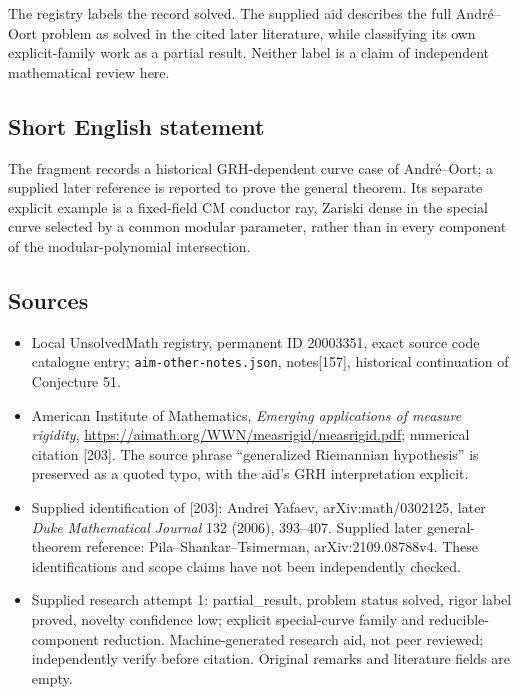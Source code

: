 \documentclass[11pt]{article}
\begin{document}
The registry labels the record solved. The supplied aid describes the full Andr\'e--Oort problem as solved in the cited later literature, while classifying its own explicit-family work as a partial result. Neither label is a claim of independent mathematical review here.
\subsection{Short English statement}
The fragment records a historical GRH-dependent curve case of Andr\'e--Oort; a supplied later reference is reported to prove the general theorem. Its separate explicit example is a fixed-field CM conductor ray, Zariski dense in the special curve selected by a common modular parameter, rather than in every component of the modular-polynomial intersection.
\subsection{Sources}
\begin{itemize}
\item Local UnsolvedMath registry, permanent ID 20003351, exact source code catalogue entry; \texttt{aim-other-notes.json}, notes[157], historical continuation of Conjecture 51.
\item American Institute of Mathematics, \emph{Emerging applications of measure rigidity}, \url{https://aimath.org/WWN/measrigid/measrigid.pdf}; numerical citation [203]. The source phrase ``generalized Riemannian hypothesis'' is preserved as a quoted typo, with the aid's GRH interpretation explicit.
\item Supplied identification of [203]: Andrei Yafaev, arXiv:math/0302125, later \emph{Duke Mathematical Journal} 132 (2006), 393--407. Supplied later general-theorem reference: Pila--Shankar--Tsimerman, arXiv:2109.08788v4. These identifications and scope claims have not been independently checked.
\item Supplied research attempt 1: partial\_result, problem status solved, rigor label proved, novelty confidence low; explicit special-curve family and reducible-component reduction. Machine-generated research aid, not peer reviewed; independently verify before citation. Original remarks and literature fields are empty.
\end{itemize}
\end{document}
